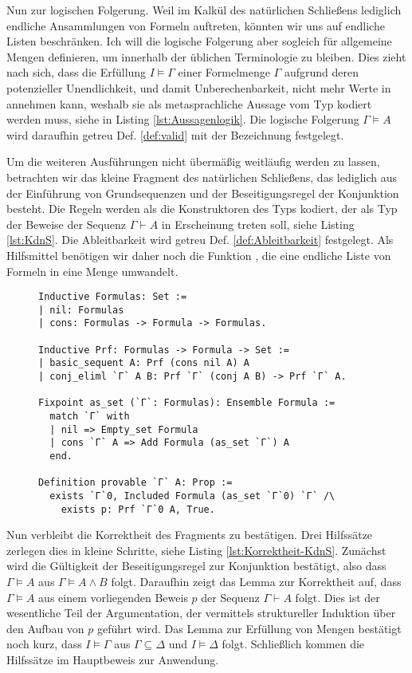 Nun zur logischen Folgerung. Weil im Kalkül des natürlichen Schließens
lediglich endliche Ansammlungen von Formeln auftreten, könnten wir uns
auf endliche Listen beschränken. Ich will die logische Folgerung aber
sogleich für allgemeine Mengen definieren,
um innerhalb der üblichen Terminologie zu bleiben. Dies zieht nach
sich, dass die Erfüllung $I\models\Gamma$ einer Formelmenge $\Gamma$ aufgrund
deren potenzieller Unendlichkeit, und damit Unberechenbarkeit, nicht
mehr Werte in  annehmen kann, weshalb sie als metasprachliche
Aussage vom Typ  kodiert werden muss, siehe
 in Listing \ref{lst:Aussagenlogik}.
Die logische Folgerung $\Gamma\models A$ wird daraufhin getreu
Def. \ref{def:valid} mit der Bezeichnung  festgelegt.

Um die weiteren Ausführungen nicht übermäßig weitläufig werden zu lassen,
betrachten wir das kleine Fragment des natürlichen Schließens, das lediglich
aus der Einführung von Grundsequenzen und der Beseitigungsregel der
Konjunktion besteht. Die Regeln werden als die Konstruktoren des Typs
 kodiert, der als Typ der Beweise der Sequenz
$\Gamma\vdash A$ in Erscheinung treten soll, siehe Listing \ref{lst:KdnS}.
Die Ableitbarkeit  wird getreu Def. \ref{def:Ableitbarkeit}
festgelegt. Als Hilfsmittel benötigen wir daher noch die Funktion
, die eine endliche Liste von Formeln in eine Menge umwandelt.

\begin{figure}[t]
\begin{lstlisting}[language=Coq, xleftmargin=\mathindent, escapechar=`,
label=lst:KdnS, caption={Fragment des natürliches Schließens und Ableitbarkeit}]
Inductive Formulas: Set :=
| nil: Formulas
| cons: Formulas -> Formula -> Formulas.

Inductive Prf: Formulas -> Formula -> Set :=
| basic_sequent A: Prf (cons nil A) A
| conj_eliml `Γ` A B: Prf `Γ` (conj A B) -> Prf `Γ` A.

Fixpoint as_set (`Γ`: Formulas): Ensemble Formula :=
  match `Γ` with
  | nil => Empty_set Formula
  | cons `Γ` A => Add Formula (as_set `Γ`) A
  end.

Definition provable `Γ` A: Prop :=
  exists `Γ`0, Included Formula (as_set `Γ`0) `Γ` /\
    exists p: Prf `Γ`0 A, True.
\end{lstlisting}
\end{figure}

Nun verbleibt die Korrektheit des Fragments zu bestätigen. Drei
Hilfssätze zerlegen dies in kleine Schritte, siehe Listing
\ref{lst:Korrektheit-KdnS}. Zunächst wird die Gültigkeit der
Beseitigungsregel zur Konjunktion bestätigt,
also dass $\Gamma\models A$ aus $\Gamma\models A\land B$ folgt. Daraufhin
zeigt das Lemma zur Korrektheit auf, dass $\Gamma\models A$ aus einem
vorliegenden Beweis $p$ der Sequenz $\Gamma\vdash A$ folgt. Dies ist
der wesentliche Teil der Argumentation, der vermittels struktureller
Induktion über den Aufbau von $p$ geführt wird. Das Lemma zur
Erfüllung von Mengen bestätigt noch kurz, dass $I\models\Gamma$
aus $\Gamma\subseteq\Delta$ und $I\models\Delta$ folgt. Schließlich
kommen die Hilfssätze im Hauptbeweis zur Anwendung.

